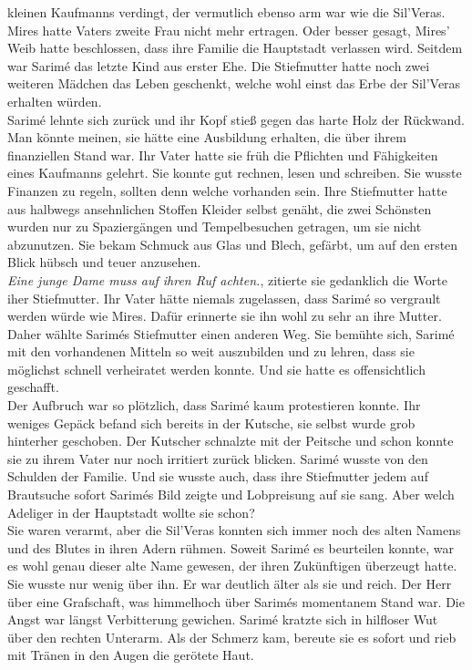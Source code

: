 kleinen Kaufmanns verdingt, der vermutlich ebenso arm war wie die Sil'Veras. Mires hatte Vaters 
zweite Frau nicht mehr ertragen. Oder besser gesagt, Mires' Weib hatte beschlossen, dass ihre 
Familie die Hauptstadt verlassen wird. Seitdem war Sarimé das letzte Kind aus erster Ehe. Die 
Stiefmutter hatte noch zwei weiteren Mädchen das Leben geschenkt, welche wohl einst das Erbe der 
Sil'Veras erhalten würden. \\
Sarimé lehnte sich zurück und ihr Kopf stieß gegen das harte Holz der Rückwand. Man könnte meinen, 
sie hätte eine Ausbildung erhalten, die über ihrem finanziellen Stand war. Ihr Vater hatte sie früh 
die Pflichten und Fähigkeiten eines Kaufmanns gelehrt. Sie konnte gut rechnen, lesen und schreiben. 
Sie wusste Finanzen zu regeln, sollten denn welche vorhanden sein. Ihre Stiefmutter hatte aus 
halbwegs ansehnlichen Stoffen Kleider selbst genäht, die zwei Schönsten wurden nur zu Spaziergängen 
und Tempelbesuchen getragen, um sie nicht abzunutzen. Sie bekam Schmuck aus Glas und Blech, gefärbt, 
um auf den ersten Blick hübsch und teuer anzusehen. \\
\textit{Eine junge Dame muss auf ihren Ruf achten.}, zitierte sie gedanklich die Worte iher 
Stiefmutter. Ihr Vater hätte niemals zugelassen, dass Sarimé so vergrault werden würde wie Mires. 
Dafür erinnerte sie ihn wohl zu sehr an ihre Mutter. Daher wählte Sarimés Stiefmutter einen anderen 
Weg. Sie bemühte sich, Sarimé mit den vorhandenen Mitteln so weit auszubilden und zu lehren, dass 
sie möglichst schnell verheiratet werden konnte. Und sie hatte es offensichtlich geschafft. \\
Der Aufbruch war so plötzlich, dass Sarimé kaum protestieren konnte. Ihr weniges Gepäck befand sich 
bereits in der Kutsche, sie selbst wurde grob hinterher geschoben. Der Kutscher schnalzte mit der 
Peitsche und schon konnte sie zu ihrem Vater nur noch irritiert zurück blicken. Sarimé wusste von 
den Schulden der Familie. Und sie wusste auch, dass ihre Stiefmutter jedem auf Brautsuche sofort 
Sarimés Bild zeigte und Lobpreisung auf sie sang. Aber welch Adeliger in der Hauptstadt wollte sie 
schon? \\
Sie waren verarmt, aber die Sil'Veras konnten sich immer noch des alten Namens und des Blutes in 
ihren Adern rühmen. Soweit Sarimé es beurteilen konnte, war es wohl genau dieser alte Name gewesen, 
der ihren Zukünftigen überzeugt hatte. Sie wusste nur wenig über ihn. Er war deutlich älter als sie 
und reich. Der Herr über eine Grafschaft, was himmelhoch über Sarimés momentanem Stand war. Die 
Angst war längst Verbitterung gewichen. Sarimé kratzte sich in hilfloser Wut über den rechten 
Unterarm. Als der Schmerz kam, bereute sie es sofort und rieb mit Tränen in den Augen die gerötete 
Haut. \\

